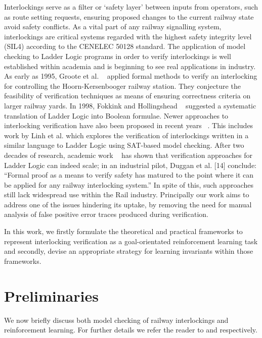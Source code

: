 \documentclass[runningheads]{llncs}
\begin{document}
Interlockings serve as a filter or ‘safety layer’ between inputs from operators, such as route setting requests, ensuring proposed changes to the current railway state avoid safety conflicts. As a vital part of any railway signalling system, interlockings are critical systems regarded with the highest safety integrity level
(SIL4) according to the CENELEC 50128 standard. The application of model checking
to Ladder Logic programs in order to verify interlockings is well established within
academia and is beginning to see real applications in industry. As early as 1995, Groote
et al. ~\cite{groote1995safety} applied formal methods to verify an interlocking for controlling the Hoorn-Kersenbooger railway station. They conjecture the feasibility of verification techniques
as means of ensuring correctness criteria on larger railway yards. In 1998, Fokkink
and Hollingshead ~\cite{fokkink1998verification} suggested a systematic translation of Ladder Logic into Boolean
formulae. Newer approaches to interlocking verification have also been proposed in recent
years ~\cite{fantechi2012some, ferrari2011model, haxthausen2008modelling}. This includes work by Linh et al. which explores the verification
of interlockings written in a similar language to Ladder Logic using SAT-based model
checking. After two decades of research, academic work ~\cite{kanso2009automated, james2013verification} has shown that verification
approaches for Ladder Logic can indeed scale; in an industrial pilot, Duggan et al. [14] conclude: “Formal proof as a means to verify safety has matured to the point where it
can be applied for any railway interlocking system.” In spite of this, such approaches still lack widespread use within the Rail industry. Principally our work aims to address one of the issues hindering its uptake, by removing the need for manual analysis of false positive error traces produced during verification. 

In this work, we firstly formulate the theoretical and practical frameworks to represent interlocking verification as a goal-orientated reinforcement learning task and secondly, devise an appropriate strategy for learning invariants within those frameworks.

\section{Preliminaries}\label{sec:preliminaries}
We now briefly discuss both model checking of railway interlockings and reinforcement learning. For further details we refer the reader to \cite{kanso2009automated, james2013verification} and \cite{mnih2016asynchronous} respectively.
\end{document}
